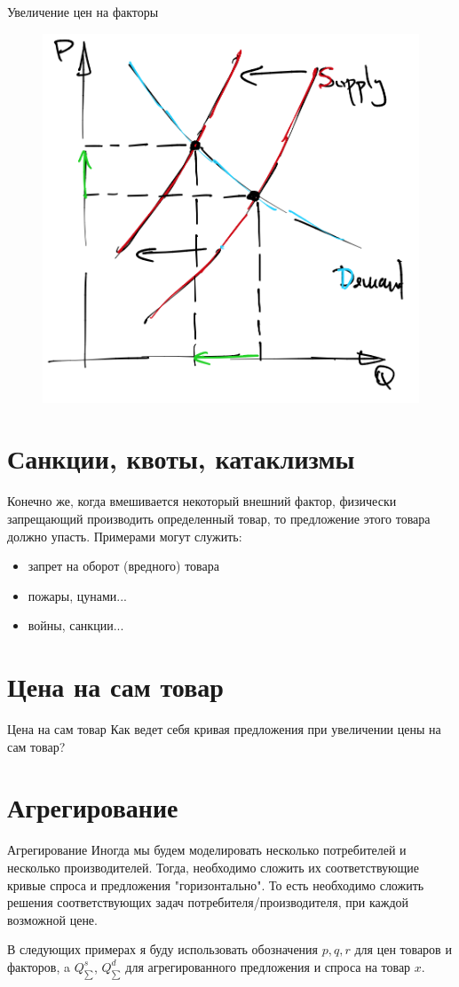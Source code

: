 \documentclass{beamer}
\begin{document}
\begin{frame}{Увеличение цен на факторы}
\begin{figure}[hbt]
\centering
\includegraphics[width=.7 \textwidth]{sup_contract.png}
\end{figure}
\end{frame}

\section{Санкции, квоты, катаклизмы}
\begin{frame}

Конечно же, когда вмешивается некоторый внешний фактор, физически запрещающий производить определенный товар, то предложение этого товара должно упасть. Примерами могут служить:
\begin{itemize}
\item запрет на оборот (вредного) товара
\item пожары, цунами...
\item войны, санкции...
\end{itemize}
\end{frame}


\section{Цена на сам товар}
\begin{frame}{Цена на сам товар}
Как ведет себя кривая предложения при увеличении цены на сам товар?
\end{frame}

\section{Агрегирование}
\begin{frame}{Агрегирование}
Иногда мы будем моделировать несколько потребителей и несколько производителей. Тогда, необходимо сложить их соответствующие кривые спроса и предложения "горизонтально". То есть необходимо сложить решения соответствующих задач потребителя/производителя, при каждой возможной цене.

В следующих примерах я буду использовать обозначения $p,q,r$ для цен товаров и факторов, a $Q^s_{\sum}$, $Q^d_{\sum}$ для агрегированного предложения и спроса на товар $x$.
\end{frame}
\end{document}
